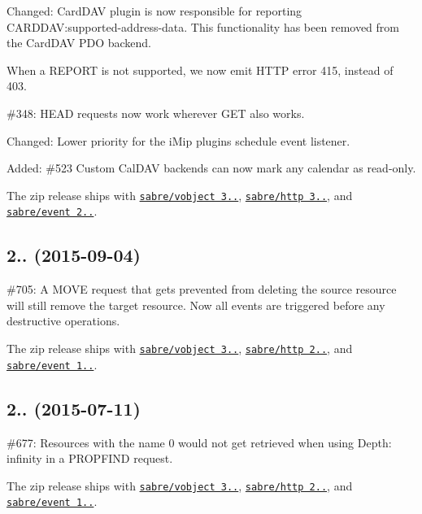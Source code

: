 \begin{DoxyItemize}
\item Changed\+: Card\+D\+AV plugin is now responsible for reporting {\ttfamily C\+A\+R\+D\+D\+AV\+:supported-\/address-\/data}. This functionality has been removed from the Card\+D\+AV P\+DO backend.
\item When a R\+E\+P\+O\+RT is not supported, we now emit H\+T\+TP error 415, instead of 403.
\item \#348\+: {\ttfamily H\+E\+AD} requests now work wherever {\ttfamily G\+ET} also works.
\item Changed\+: Lower priority for the i\+Mip plugins {\ttfamily schedule} event listener.
\item Added\+: \#523 Custom Cal\+D\+AV backends can now mark any calendar as read-\/only.
\item The zip release ships with \href{http://sabre.io/vobject/}{\tt sabre/vobject 3..}, \href{http://sabre.io/http/}{\tt sabre/http 3..}, and \href{http://sabre.io/event/}{\tt sabre/event 2..}.
\end{DoxyItemize}

\subsection*{2.. (2015-\/09-\/04) }


\begin{DoxyItemize}
\item \#705\+: A {\ttfamily M\+O\+VE} request that gets prevented from deleting the source resource will still remove the target resource. Now all events are triggered before any destructive operations.
\item The zip release ships with \href{http://sabre.io/vobject/}{\tt sabre/vobject 3..}, \href{http://sabre.io/http/}{\tt sabre/http 2..}, and \href{http://sabre.io/event/}{\tt sabre/event 1..}.
\end{DoxyItemize}

\subsection*{2.. (2015-\/07-\/11) }


\begin{DoxyItemize}
\item \#677\+: Resources with the name \textquotesingle{}0\textquotesingle{} would not get retrieved when using {\ttfamily Depth\+: infinity} in a {\ttfamily P\+R\+O\+P\+F\+I\+ND} request.
\item The zip release ships with \href{http://sabre.io/vobject/}{\tt sabre/vobject 3..}, \href{http://sabre.io/http/}{\tt sabre/http 2..}, and \href{http://sabre.io/event/}{\tt sabre/event 1..}.
\end{DoxyItemize}


